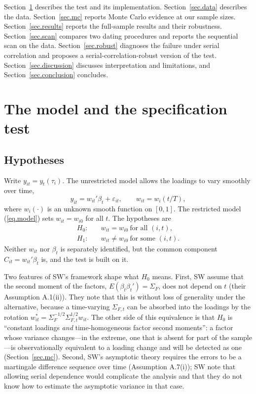 \documentclass[11pt]{article}
\begin{document}
Section~\ref{sec.test} describes the test and its implementation. Section~\ref{sec.data} describes the data. Section~\ref{sec.mc} reports Monte Carlo evidence at our sample sizes. Section~\ref{sec.results} reports the full-sample results and their robustness. Section~\ref{sec.scan} compares two dating procedures and reports the sequential scan on the data. Section~\ref{sec.robust} diagnoses the failure under serial correlation and proposes a serial-correlation-robust version of the test. Section~\ref{sec.discussion} discusses interpretation and limitations, and Section~\ref{sec.conclusion} concludes.

\section{The model and the specification test}\label{sec.test}

\subsection{Hypotheses}

Write $y_{it}=y_t(\tau_i)$. The unrestricted model allows the loadings to vary smoothly over time,
\begin{equation}\label{eq.tv}
  y_{it} = w_{it}'\beta_t + \varepsilon_{it}, \qquad w_{it}=w_i(t/T),
\end{equation}
where $w_i(\cdot)$ is an unknown smooth function on $[0,1]$. The restricted model (\ref{eq.model}) sets $w_{it}=w_{i0}$ for all $t$. The hypotheses are
\begin{align*}
  H_0:&\quad w_{it}=w_{i0}\ \text{for all } (i,t),\\
  H_1:&\quad w_{it}\ne w_{i0}\ \text{for some } (i,t).
\end{align*}
Neither $w_{it}$ nor $\beta_t$ is separately identified, but the common component $C_{it}=w_{it}'\beta_t$ is, and the test is built on it.

Two features of SW's framework shape what $H_0$ means. First, SW assume that the second moment of the factors, $E(\beta_t\beta_t')=\Sigma_F$, does not depend on $t$ (their Assumption A.1(ii)). They note that this is without loss of generality under the alternative, because a time-varying $\Sigma_{F,t}$ can be absorbed into the loadings by the rotation $w^*_{it}=\Sigma_F^{-1/2}\Sigma_{F,t}^{1/2}w_{it}$. The other side of this equivalence is that $H_0$ is ``constant loadings \emph{and} time-homogeneous factor second moments'': a factor whose variance changes---in the extreme, one that is absent for part of the sample---is observationally equivalent to a loading change and will be detected as one (Section~\ref{sec.mc}). Second, SW's asymptotic theory requires the errors to be a martingale difference sequence over time (Assumption A.7(i)); SW note that allowing serial dependence would complicate the analysis and that they do not know how to estimate the asymptotic variance in that case.
\end{document}
